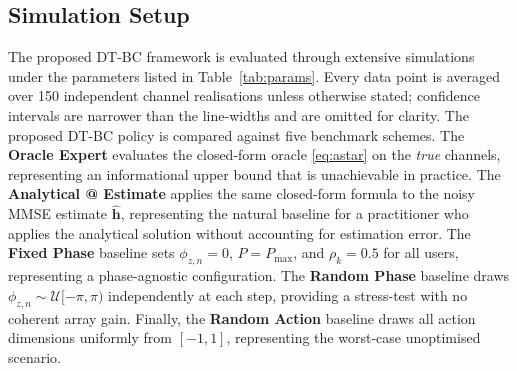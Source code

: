 \documentclass[journal]{IEEEtran}
\begin{document}
\subsection{Simulation Setup}

The proposed DT-BC framework is evaluated through extensive simulations
under the parameters listed in Table~\ref{tab:params}. Every data
point is averaged over 150 independent channel realisations unless
otherwise stated; confidence intervals are narrower than the
line-widths and are omitted for clarity. The proposed DT-BC policy
is compared against five benchmark schemes. The \textbf{Oracle Expert}
evaluates the closed-form oracle \eqref{eq:astar} on the
\emph{true} channels, representing an informational upper bound that
is unachievable in practice. The \textbf{Analytical @ Estimate} applies
the same closed-form formula to the noisy MMSE estimate $\hat{\mathbf{h}}$,
representing the natural baseline for a practitioner who applies the
analytical solution without accounting for estimation error. The
\textbf{Fixed Phase} baseline sets $\phi_{z,n}\!=\!0$,
$P\!=\!P_{\max}$, and $\rho_k\!=\!0.5$ for all users, representing
a phase-agnostic configuration. The \textbf{Random Phase} baseline
draws $\phi_{z,n}\!\sim\!\mathcal{U}[-\pi,\pi)$ independently at each
step, providing a stress-test with no coherent array gain. Finally,
the \textbf{Random Action} baseline draws all action dimensions
uniformly from $[-1,1]$, representing the worst-case unoptimised
scenario.
\end{document}
